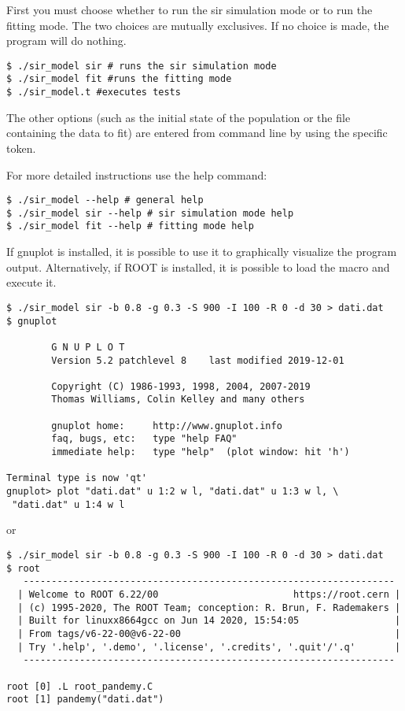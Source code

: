 First you must choose whether to run the sir simulation mode or to run the fitting mode. The two choices are mutually exclusives. If no choice is made, the program will do nothing.
\begin{verbatim}
$ ./sir_model sir # runs the sir simulation mode
$ ./sir_model fit #runs the fitting mode
$ ./sir_model.t #executes tests
\end{verbatim}
The other options (such as the initial state of the population or the file containing the data to fit) are entered from command line by using the specific token.

For more detailed instructions use the help command:
\begin{verbatim}
$ ./sir_model --help # general help
$ ./sir_model sir --help # sir simulation mode help
$ ./sir_model fit --help # fitting mode help
\end{verbatim}

If gnuplot is installed, it is possible to use it to graphically visualize the program output. Alternatively, if ROOT is installed, it is possible to load the macro and execute it.
\begin{verbatim}
$ ./sir_model sir -b 0.8 -g 0.3 -S 900 -I 100 -R 0 -d 30 > dati.dat
$ gnuplot

        G N U P L O T
        Version 5.2 patchlevel 8    last modified 2019-12-01

        Copyright (C) 1986-1993, 1998, 2004, 2007-2019
        Thomas Williams, Colin Kelley and many others

        gnuplot home:     http://www.gnuplot.info
        faq, bugs, etc:   type "help FAQ"
        immediate help:   type "help"  (plot window: hit 'h')

Terminal type is now 'qt'
gnuplot> plot "dati.dat" u 1:2 w l, "dati.dat" u 1:3 w l, \
 "dati.dat" u 1:4 w l
\end{verbatim} or 
\begin{verbatim}
$ ./sir_model sir -b 0.8 -g 0.3 -S 900 -I 100 -R 0 -d 30 > dati.dat
$ root
   ------------------------------------------------------------------
  | Welcome to ROOT 6.22/00                        https://root.cern |
  | (c) 1995-2020, The ROOT Team; conception: R. Brun, F. Rademakers |
  | Built for linuxx8664gcc on Jun 14 2020, 15:54:05                 |
  | From tags/v6-22-00@v6-22-00                                      |
  | Try '.help', '.demo', '.license', '.credits', '.quit'/'.q'       |
   ------------------------------------------------------------------

root [0] .L root_pandemy.C
root [1] pandemy("dati.dat")
\end{verbatim}

